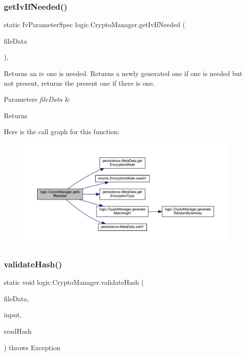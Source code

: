\subsubsection{\texorpdfstring{get\+Iv\+If\+Needed()}{getIvIfNeeded()}}
{\footnotesize\ttfamily static Iv\+Parameter\+Spec logic.\+Crypto\+Manager.\+get\+Iv\+If\+Needed (\begin{DoxyParamCaption}\item[{\mbox{\hyperlink{classpersistence_1_1_meta_data}{Meta\+Data}}}]{file\+Data }\end{DoxyParamCaption})\hspace{0.3cm}{\ttfamily [static]}, {\ttfamily [private]}}

Returns an iv one is needed. Returns a newly generated one if one is needed but not present, returns the present one if there is one. 
\begin{DoxyParams}{Parameters}
{\em file\+Data} & \\
\hline
\end{DoxyParams}
\begin{DoxyReturn}{Returns}

\end{DoxyReturn}
Here is the call graph for this function\+:\nopagebreak
\begin{figure}[H]
\begin{center}
\leavevmode
\includegraphics[width=350pt]{classlogic_1_1_crypto_manager_a2d1e7744033690a5eaaeed1e5a127485_cgraph}
\end{center}
\end{figure}
\mbox{\label{classlogic_1_1_crypto_manager_acf7654dc6d2cdab1b9161f428145a6b8}} 
\subsubsection{\texorpdfstring{validate\+Hash()}{validateHash()}}
{\footnotesize\ttfamily static void logic.\+Crypto\+Manager.\+validate\+Hash (\begin{DoxyParamCaption}\item[{\mbox{\hyperlink{classpersistence_1_1_meta_data}{Meta\+Data}}}]{file\+Data,  }\item[{byte \mbox{[}$\,$\mbox{]}}]{input,  }\item[{String}]{read\+Hash }\end{DoxyParamCaption}) throws Exception\hspace{0.3cm}{\ttfamily [static]}}

